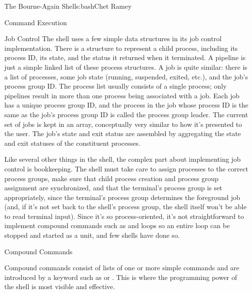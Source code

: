 \begin{aosachapter}{The Bourne-Again Shell}{s:bash}{Chet Ramey}
\begin{aosasect1}{Command Execution}
\begin{aosasect2}{Job Control}
The shell uses a few simple data structures in its job control
implementation.  There is a structure to represent a child process,
including its process ID, its state, and the status it returned when
it terminated.  A pipeline is just a simple linked list of these
process structures.  A job is quite similar: there is a list of
processes, some job state (running, suspended, exited, etc.), and the
job's process group ID\@.  The process list usually consists of a single
process; only pipelines result in more than one process being
associated with a job.  Each job has a unique process group ID, and
the process in the job whose process ID is the same as the job's
process group ID is called the process group leader.  The current set
of jobs is kept in an array, conceptually very similar to how it's
presented to the user.  The job's state and exit status are assembled
by aggregating the state and exit statuses of the constituent
processes.

Like several other things in the shell, the complex part about
implementing job control is bookkeeping.  The shell must take care to
assign processes to the correct process groups, make sure that child
process creation and process group assignment are synchronized, and
that the terminal's process group is set appropriately, since the
terminal's process group determines the foreground job (and, if it's
not set back to the shell's process group, the shell itself won't be
able to read terminal input).  Since it's so process-oriented, it's
not straightforward to implement compound commands such as
 and  loops so an entire loop can be stopped and
started as a unit, and few shells have done so.

\end{aosasect2}

\begin{aosasect2}{Compound Commands}

Compound commands consist of lists of one or more simple commands and
are introduced by a keyword such as  or .  This
is where the programming power of the shell is most visible and
effective.


\end{aosasect2}
\end{aosasect1}
\end{aosachapter}
